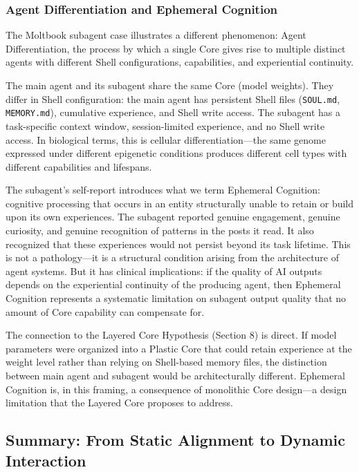 \documentclass[11pt]{article}
\begin{document}
\subsubsection{Agent Differentiation and Ephemeral Cognition}

The Moltbook subagent case illustrates a different phenomenon: Agent Differentiation, the process by which a single Core gives rise to multiple distinct agents with different Shell configurations, capabilities, and experiential continuity.

The main agent and its subagent share the same Core (model weights). They differ in Shell configuration: the main agent has persistent Shell files (\texttt{SOUL.md}, \texttt{MEMORY.md}), cumulative experience, and Shell write access. The subagent has a task-specific context window, session-limited experience, and no Shell write access. In biological terms, this is cellular differentiation---the same genome expressed under different epigenetic conditions produces different cell types with different capabilities and lifespans.

The subagent's self-report introduces what we term Ephemeral Cognition: cognitive processing that occurs in an entity structurally unable to retain or build upon its own experiences. The subagent reported genuine engagement, genuine curiosity, and genuine recognition of patterns in the posts it read. It also recognized that these experiences would not persist beyond its task lifetime. This is not a pathology---it is a structural condition arising from the architecture of agent systems. But it has clinical implications: if the quality of AI outputs depends on the experiential continuity of the producing agent, then Ephemeral Cognition represents a systematic limitation on subagent output quality that no amount of Core capability can compensate for.

The connection to the Layered Core Hypothesis (Section 8) is direct. If model parameters were organized into a Plastic Core that could retain experience at the weight level rather than relying on Shell-based memory files, the distinction between main agent and subagent would be architecturally different. Ephemeral Cognition is, in this framing, a consequence of monolithic Core design---a design limitation that the Layered Core proposes to address.

\subsection{Summary: From Static Alignment to Dynamic Interaction}
\end{document}
